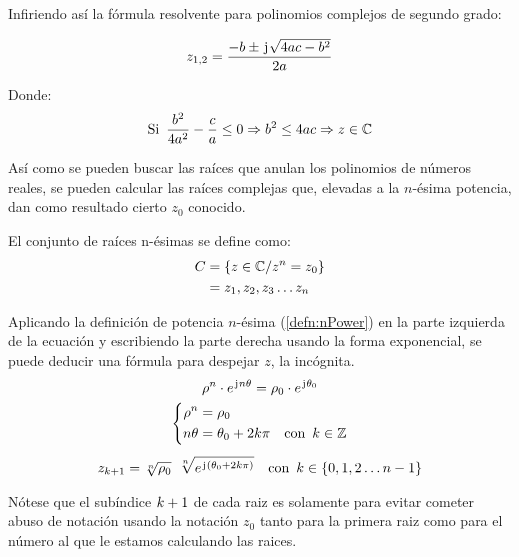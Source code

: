 Infiriendo así la fórmula resolvente para polinomios complejos de segundo grado:

\begin{mdframed}[style=PropertyFrame]
    \begin{prop}
    \end{prop}
    \begin{equation*}
        z_{1,2} = \frac{-b \pm \mkern2mu\mathrm{j}\mkern1mu \sqrt{4ac-b^2}}{2a}
    \end{equation*}
\end{mdframed}

Donde:
\begin{equation*}
    \textrm{Si} \enspace \frac{b^2}{4a^2} - \frac{c}{a} \leq 0 \Rightarrow b^2 \leq 4ac \Rightarrow z \in \mathbb{C}
\end{equation*}

Así como se pueden buscar las raíces que anulan los polinomios de números reales, se pueden calcular las raíces complejas que, elevadas a la $n$-ésima potencia, dan como resultado cierto $z_0$ conocido.

El conjunto de raíces n-ésimas se define como:
\begin{align*}
    C &= { \left\{ {z \in \mathbb{C} / z^n=z_0} \right\} }
    \\
    &= z_1,z_2,z_3 \ldots z_n
\end{align*}

Aplicando la definición de potencia $n$-ésima (\ref{defn:nPower}) en la parte izquierda de la ecuación y escribiendo la parte derecha usando la forma exponencial, se puede deducir una fórmula para despejar $z$, la incógnita.
\begin{gather*}
    \rho^n \cdot e^{\mkern2mu\mathrm{j}\mkern1mu n \theta} = \rho_0 \cdot e^{\mkern2mu\mathrm{j}\mkern1mu \theta_0}
    \\
    \left\{
    \begin{aligned}
        \rho^n &= \rho_0
        \\
        n \theta &= \theta_0 + 2k \pi \quad \textrm{con} \enspace k \in \mathbb{Z}
    \end{aligned}
    \right.
    \\[1ex]
    z_{k+1} = \sqrt[n]{\rho_0} \enspace \sqrt[n]{e^{\mkern2mu\mathrm{j}\mkern1mu (\theta_0 + 2 k \pi)}} \quad \textrm{con} \enspace k \in \{0,1,2 \ldots n-1\}
\end{gather*}

Nótese que el subíndice $k+1$ de cada raiz es solamente para evitar cometer abuso de notación usando la notación $z_0$ tanto para la primera raiz como para el número al que le estamos calculando las raices.

